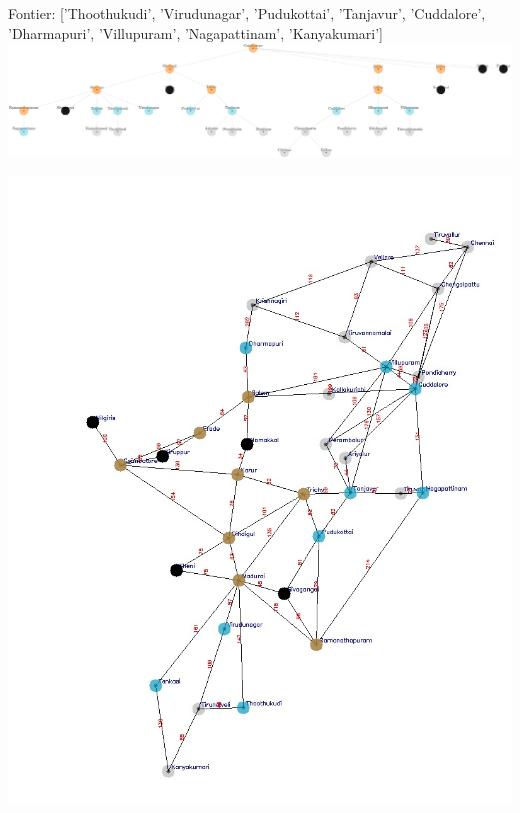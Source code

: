 \documentclass[xcolor=table]{beamer}
\begin{document}
\begin{frame}
  { \tiny Fontier: ['Thoothukudi', 'Virudunagar', 'Pudukottai', 'Tanjavur', 'Cuddalore', 'Dharmapuri', 'Villupuram', 'Nagapattinam', 'Kanyakumari']}
  \includegraphics[width=1\textwidth]{../BFSNodes/20-1.png}
  \begin{center}
    \includegraphics[height=0.55\textheight]{../BFSoutput/tamilBFS18.jpg}
  \end{center}
\end{frame}
\end{document}
